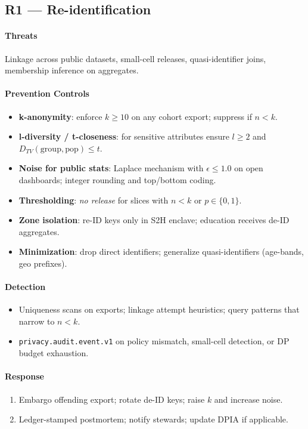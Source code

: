 \documentclass[11pt]{article}
\theoremstyle{plain}
\begin{document}
\subsection{R1 — Re-identification}
\paragraph{Threats}
Linkage across public datasets, small-cell releases, quasi-identifier joins, membership inference on aggregates.

\paragraph{Prevention Controls}
\begin{itemize}
  \item \textbf{k-anonymity}: enforce $k \ge 10$ on any cohort export; suppress if $n<k$.
  \item \textbf{l-diversity / t-closeness}: for sensitive attributes ensure $l \ge 2$ and $D_{TV}(\text{group},\text{pop}) \le t$.
  \item \textbf{Noise for public stats}: Laplace mechanism with $\epsilon \le 1.0$ on open dashboards; integer rounding and top/bottom coding.
  \item \textbf{Thresholding}: \emph{no release} for slices with $n<k$ or $p\in\{0,1\}$.
  \item \textbf{Zone isolation}: re-ID keys only in S2H enclave; education receives de-ID aggregates.
  \item \textbf{Minimization}: drop direct identifiers; generalize quasi-identifiers (age-bands, geo prefixes).
\end{itemize}

\paragraph{Detection}
\begin{itemize}
  \item Uniqueness scans on exports; linkage attempt heuristics; query patterns that narrow to $n<k$.
  \item \texttt{privacy.audit.event.v1} on policy mismatch, small-cell detection, or DP budget exhaustion.
\end{itemize}

\paragraph{Response}
\begin{enumerate}
  \item Embargo offending export; rotate de-ID keys; raise $k$ and increase noise.
  \item Ledger-stamped postmortem; notify stewards; update DPIA if applicable.
\end{enumerate}
\end{document}
